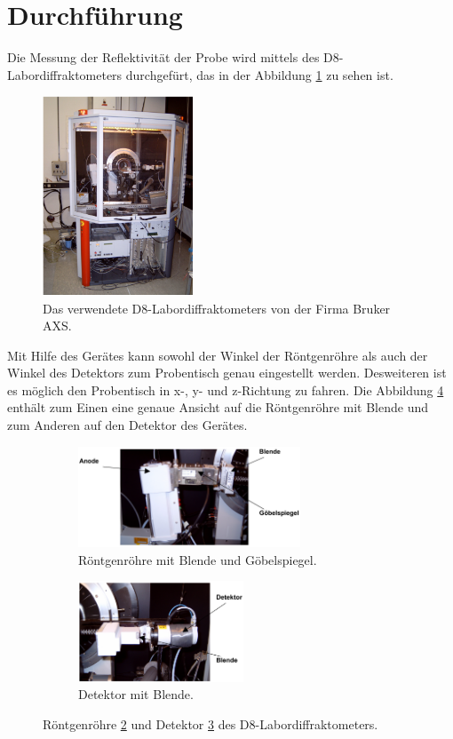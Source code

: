 \section{Durchführung}
\label{sec:Durchführung}
Die Messung der Reflektivität der Probe wird mittels
des D8-Labordiffraktometers
durchgefürt, das in der Abbildung \ref{fig:app} zu sehen ist.
\begin{figure}
  \centering
  \includegraphics[width=0.4\textwidth]{bilder/apparatur.PNG}
  \caption{Das verwendete D8-Labordiffraktometers von der Firma Bruker AXS. \cite{sample}}
  \label{fig:app}
\end{figure}
Mit Hilfe des Gerätes kann sowohl der
Winkel der Röntgenröhre
als auch der Winkel des Detektors zum Probentisch
genau eingestellt werden. Desweiteren ist es
möglich den Probentisch in x-, y- und z-Richtung zu fahren.
Die Abbildung \ref{fig:anode_det} enthält zum Einen eine genaue Ansicht auf die
Röntgenröhre mit Blende und zum Anderen auf den Detektor des Gerätes.

\begin{figure}
  \centering
  \begin{subfigure}{0.59\textwidth}
  \includegraphics[height=3cm]{bilder/anode.PNG}
  \caption{Röntgenröhre mit Blende und Göbelspiegel.}
  \label{fig:anode}
\end{subfigure}
\begin{subfigure}{0.39\textwidth}
\includegraphics[height=3cm]{bilder/detektor.PNG}
\caption{Detektor mit Blende.}
\label{fig:det}
\end{subfigure}
\caption{Röntgenröhre \ref{fig:anode} und Detektor \ref{fig:det} des D8-Labordiffraktometers. \cite{sample}}
\label{fig:anode_det}
\end{figure}

